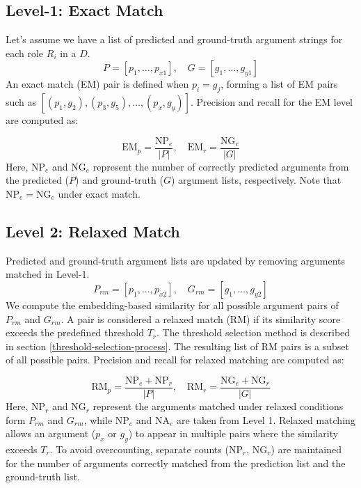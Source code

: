 \subsection{Level-1: Exact Match}
\label{subsection:exact-match}
Let's assume we have a list of predicted and ground-truth argument strings for each role $R_i$ in a $D$. 
\[
P = [p_1, \ldots, p_{x1}], \quad
G = [g_1, \ldots, g_{y1}] 
\]
An exact match (EM) pair is defined when $p_i = g_j$, forming a list of EM pairs such as \( [(p_1, g_2), (p_3, g_5), \ldots, (p_x, g_y)] \). Precision and recall for the EM level are computed as:

{
\small
\[
\text{EM}_p = \frac{\text{NP}_e}{|P|}, \quad
\text{EM}_r = \frac{\text{NG}_e}{|G|}
\]
}
Here, \(\text{NP}_e\) and \(\text{NG}_e\) represent the number of correctly predicted arguments from the predicted (\(P\)) and ground-truth (\(G\)) argument lists, respectively. Note that \(\text{NP}_e = \text{NG}_e\) under exact match. 

\subsection{Level 2: Relaxed Match}
\label{subsection:relaxed-match}
Predicted and ground-truth argument lists are updated by removing arguments matched in Level-1. 
\[
P_{rm} = [p_1, \ldots, p_{x2}], \quad
G_{rm} = [g_1, \ldots, g_{y2}] 
\]
We compute the embedding-based similarity for all possible argument pairs of $P_{rm}$ and $G_{rm}$. A pair is considered a relaxed match (RM) if its similarity score exceeds the predefined threshold \(T_r\). The threshold selection method is described in section \ref{threshold-selection-process}.  The resulting list of RM pairs is a subset of all possible pairs. Precision and recall for relaxed matching are computed as:

{\small
\[
\text{RM}_{p} = \frac{\text{NP}_e + \text{NP}_r}{|P|}, \quad
\text{RM}_{r} = \frac{\text{NG}_e + \text{NG}_r}{|G|}
\]
}
Here, \(\text{NP}_r\) and \(\text{NG}_r\) represent the arguments matched under relaxed conditions form $P_{rm}$ and $G_{rm}$, while \(\text{NP}_e\) and \(\text{NA}_e\) are taken from Level 1. Relaxed matching allows an argument (\(p_x\) or \(g_y\)) to appear in multiple pairs where the similarity exceeds \(T_r\). To avoid overcounting, separate counts ($\text{NP}_r$, $\text{NG}_r$) are maintained for the number of arguments correctly matched from the prediction list and the ground-truth list.

